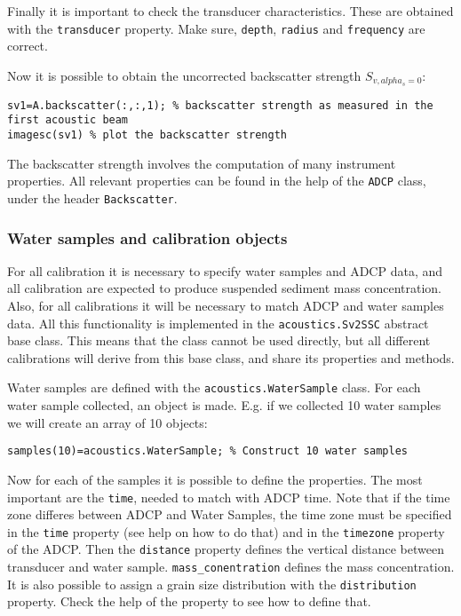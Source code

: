 \documentclass[]{article}
\begin{document}
Finally it is important to check the transducer characteristics. These are obtained with the \lstinline!transducer! property. Make sure, \lstinline!depth!, \lstinline!radius! and \lstinline!frequency! are correct.

Now it is possible to obtain the uncorrected backscatter strength $S_{v,alpha_s=0}$:
\begin{lstlisting}
sv1=A.backscatter(:,:,1); % backscatter strength as measured in the first acoustic beam
imagesc(sv1) % plot the backscatter strength
\end{lstlisting}

The backscatter strength involves the computation of many instrument properties. All relevant properties can be found in the help of the \lstinline!ADCP! class, under the header \lstinline!Backscatter!.

\subsubsection{Water samples and calibration objects}
For all calibration it is necessary to specify water samples and ADCP data, and all calibration are expected to produce suspended sediment mass concentration. Also, for all calibrations it will be necessary to match ADCP and water samples data. All this functionality is implemented in the \lstinline!acoustics.Sv2SSC! abstract base class. This means that the class cannot be used directly, but all different calibrations will derive from this base class, and share its properties and methods.

Water samples are defined with the \lstinline!acoustics.WaterSample! class. For each water sample collected, an object is made. E.g. if we collected 10 water samples we will create an array of 10 objects:
\begin{lstlisting}
samples(10)=acoustics.WaterSample; % Construct 10 water samples
\end{lstlisting}
Now for each of the samples it is possible to define the properties. The most important are the \lstinline!time!, needed to match with ADCP time. Note that if the time zone differes between ADCP and Water Samples, the time zone must be specified in the \lstinline!time! property (see help on how to do that) and in the \lstinline!timezone! property of the ADCP. Then the \lstinline!distance! property defines the vertical distance between transducer and water sample. \lstinline!mass_conentration! defines the mass concentration. It is also possible to assign a grain size distribution with the \lstinline!distribution! property. Check the help of the property to see how to define that. 
\end{document}
